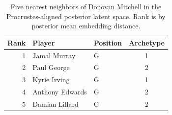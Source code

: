 \begin{table}[htbp]
  \centering\small
  \begin{tabular}{rllc}
    \toprule
    Rank & Player & Position & Archetype \\
    \midrule
    1 & Jamal Murray & G & 1 \\
    2 & Paul George & G & 2 \\
    3 & Kyrie Irving & G & 1 \\
    4 & Anthony Edwards & G & 2 \\
    5 & Damian Lillard & G & 2 \\
    \bottomrule
  \end{tabular}
  \caption{Five nearest neighbors of Donovan Mitchell in the Procrustes-aligned posterior latent space. Rank is by posterior mean embedding distance.}
  \label{tab:Donovan_Mitchell_neighbors}
\end{table}

